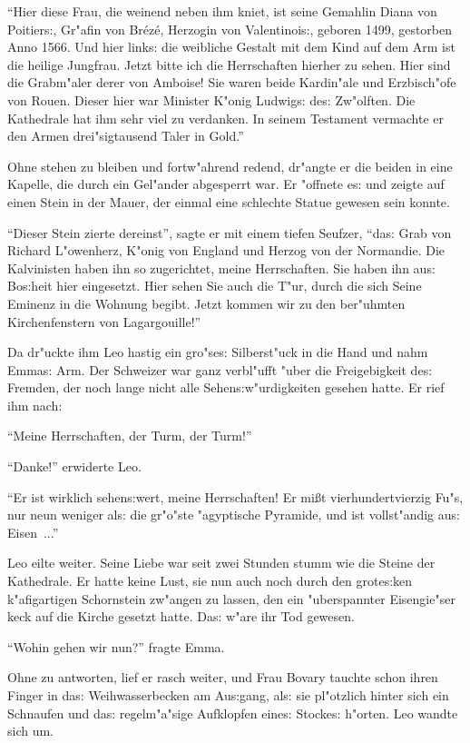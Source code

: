 \documentclass[oneside,12pt]{book}
\newcommand{\s}{s:}%
\begin{document}
"`Hier diese Frau, die weinend neben ihm kniet, ist seine Gemahlin
Diana von Poitier{\s}, Gr"afin von Br\'ez\'e, Herzogin von
Valentinoi{\s}, geboren 1499, gestorben Anno 1566. Und hier
link{\s} die weibliche Gestalt mit dem Kind auf dem Arm ist die
heilige Jungfrau. Jetzt bitte ich die Herrschaften hierher zu
sehen. Hier sind die Grabm"aler derer von Amboise! Sie waren beide
Kardin"ale und Erzbisch"ofe von Rouen. Dieser hier war Minister
K"onig Ludwig{\s} de{\s} Zw"olften. Die Kathedrale hat ihm sehr
viel zu verdanken. In seinem Testament vermachte er den Armen
drei"sigtausend Taler in Gold."'

Ohne stehen zu bleiben und fortw"ahrend redend, dr"angte er die
beiden in eine Kapelle, die durch ein Gel"ander abgesperrt war. Er
"offnete e{\s} und zeigte auf einen Stein in der Mauer, der einmal
eine schlechte Statue gewesen sein konnte.

"`Dieser Stein zierte dereinst"', sagte er mit einem tiefen
Seufzer, "`da{\s} Grab von Richard L"owenherz, K"onig von England
und Herzog von der Normandie. Die Kalvinisten haben ihn so
zugerichtet, meine Herrschaften. Sie haben ihn au{\s} Bo{\s}heit
hier eingesetzt. Hier sehen Sie auch die T"ur, durch die sich
Seine Eminenz in die Wohnung begibt. Jetzt kommen wir zu den
ber"uhmten Kirchenfenstern von Lagargouille!"'

Da dr"uckte ihm Leo hastig ein gro"se{\s} Silberst"uck in die Hand
und nahm Emma{\s} Arm. Der Schweizer war ganz verbl"ufft "uber die
Freigebigkeit de{\s} Fremden, der noch lange nicht alle
Sehen{\s}w"urdigkeiten gesehen hatte. Er rief ihm nach:

"`Meine Herrschaften, der Turm, der Turm!"'

"`Danke!"' erwiderte Leo.

"`Er ist wirklich sehen{\s}wert, meine Herrschaften! Er mi{\ss}t
vierhundertvierzig Fu"s, nur neun weniger al{\s} die gr"o"ste
"agyptische Pyramide, und ist vollst"andig au{\s} Eisen~..."'

Leo eilte weiter. Seine Liebe war seit zwei Stunden stumm wie die
Steine der Kathedrale. Er hatte keine Lust, sie nun auch noch
durch den grote{\s}ken k"afigartigen Schornstein zw"angen zu
lassen, den ein "uberspannter Eisengie"ser keck auf die Kirche
gesetzt hatte. Da{\s} w"are ihr Tod gewesen.

"`Wohin gehen wir nun?"' fragte Emma.

Ohne zu antworten, lief er rasch weiter, und Frau Bovary tauchte
schon ihren Finger in da{\s} Weihwasserbecken am Au{\s}gang,
al{\s} sie pl"otzlich hinter sich ein Schnaufen und da{\s}
regelm"a"sige Aufklopfen eine{\s} Stocke{\s} h"orten. Leo wandte
sich um.
\end{document}
